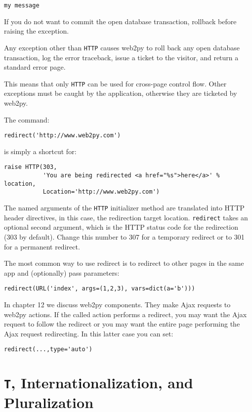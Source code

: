 \documentclass[justified,sixbynine,notoc]{tufte-book}
\def\ft{\small\tt}
\begin{document}
\begin{fullwidth}
\begin{lstlisting}
my message
\end{lstlisting}

If you do not want to commit the open database transaction, rollback before raising the exception.

Any exception other than {\ft HTTP} causes web2py to roll back any open database transaction, log the error traceback, issue a ticket to the visitor, and return a standard error page.

This means that only {\ft HTTP} can be used for cross-page control flow. Other exceptions must be caught by the application, otherwise they are ticketed by web2py.

The command:
\begin{lstlisting}
redirect('http://www.web2py.com')
\end{lstlisting}
\noindent is simply a shortcut for:
\begin{lstlisting}
raise HTTP(303,
           'You are being redirected <a href="%s">here</a>' % location,
           Location='http://www.web2py.com')
\end{lstlisting}

The named arguments of the {\ft HTTP} initializer method are translated into HTTP header directives, in this case, the redirection target location. {\ft redirect} takes an optional second argument, which is the HTTP status code for the redirection (303 by default). Change this number to 307 for a temporary redirect or to 301 for a permanent redirect.

The most common way to use redirect is to redirect to other pages in the same app and (optionally) pass parameters:

\begin{lstlisting}
redirect(URL('index', args=(1,2,3), vars=dict(a='b')))
\end{lstlisting}

In chapter 12 we discuss web2py components. They make Ajax requests to web2py actions. If the called action performs a redirect, you may want the Ajax request to follow the redirect or you may want the entire page performing the Ajax request redirecting. In this latter case you can set:

\begin{lstlisting}
redirect(...,type='auto')
\end{lstlisting}

\goodbreak\section{{\ft T}, Internationalization, and Pluralization}


\end{fullwidth}
\end{document}
